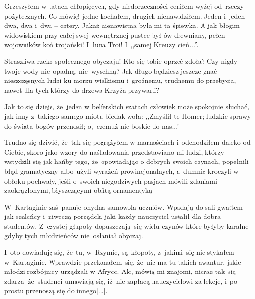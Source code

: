 % 
\noi Grzeszyłem w~latach chłopięcych, gdy niedorzeczności ceniłem
wyżej od~rzeczy pożytecznych. Co mówię! jedne kochałem, drugich
nienawidziłem. Jeden i~jeden -- dwa, dwa i~dwa -- cztery. Jakaż
nienawistna była mi ta śpiewka. A jak błogim widowiskiem przy całej
swej wewnętrznej pustce był ów drewniany, pełen wojowników koń
trojański! I~łuna Troi! I~,,samej Kreuzy cień...''.


\noi Straszliwa rzeko społecznego obyczaju! Kto się tobie oprzeć
zdoła? Czy nigdy twoje wody nie~opadną, nie~wyschną? Jak długo
będziesz jeszcze gnać nieszczęsnych ludzi ku morzu wielkiemu
i~groźnemu, trudnemu do przebycia, nawet dla tych którzy do drzewa
Krzyża przywarli?


\noi Jak to się dzieje, że~jeden w belferskich szatach człowiek może
spokojnie słuchać, jak inny z~takiego samego miotu biedak woła:
,,Zmyślił to Homer; ludzkie sprawy do świata bogów przenosił;
o,~czemuż nie boskie do nas...''


\noi Trudno się dziwić, że~tak się pogrążyłem w marnościach
i~odchodziłem daleko od Ciebie, skoro jako wzory do naśladowania
przedstawiano mi ludzi, którzy wstydzili się jak hańby tego,
że~opowiadając o dobrych swoich czynach, popełnili błąd gramatyczny
albo~użyli wyrażeń prowincjonalnych, a~dumnie kroczyli w obłoku
pochwały, jeśli o~swoich niegodziwych pasjach mówili zdaniami
zaokrąglonymi, błyszczącymi obfitą ornamentyką.


\noi W~Kartaginie zaś~panuje ohydna samowola uczniów. Wpadają do sali
gwałtem jak szaleńcy i~niweczą porządek, jaki każdy nauczyciel ustalił
dla dobra studentów. Z~czystej głupoty dopuszczają~się wielu czynów
które byłyby karalne gdyby tych młodzieńców nie~osłaniał obyczaj.


\noi I~oto dowiaduję się, że~tu, w~Rzymie, są~kłopoty, z~jakimi~się
nie stykałem w~Kartaginie. Wprawdzie przekonałem~się, że~nie ma tu
takich awantur, jakie młodzi rozbójnicy urządzali w Afryce. Ale, mówią
mi znajomi, nieraz tak~się zdarza, że~studenci umawiają się, iż~nie
zapłacą nauczycielowi za lekcje, i~po prostu przenoszą się do
innego[...].

